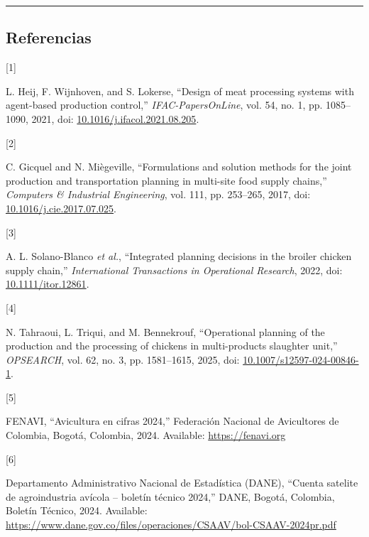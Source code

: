 \documentclass[
  spanish,
  12pt,
]{article}
\newlength{\cslhangindent}
\newlength{\csllabelwidth}
\newenvironment{CSLReferences}[2] %
 {\begin{list}{}{%
  \setlength{\itemindent}{0pt}
  \setlength{\leftmargin}{0pt}
  \setlength{\parsep}{0pt}
  \ifodd #1
   \setlength{\leftmargin}{\cslhangindent}
   \setlength{\itemindent}{-1\cslhangindent}
  \fi
  \setlength{\itemsep}{#2\baselineskip}}}
 {\end{list}}
\newcommand{\CSLLeftMargin}[1]{\parbox[t]{\csllabelwidth}{\strut#1\strut}}
\newcommand{\CSLRightInline}[1]{\parbox[t]{\linewidth - \csllabelwidth}{\strut#1\strut}}
\begin{document}
\begin{center}\rule{0.5\linewidth}{0.5pt}\end{center}

\subsection{Referencias}\label{referencias}

\protect{}\label{refs}
\begin{CSLReferences}{0}{0}
\CSLLeftMargin{{[}1{]} }%
\CSLRightInline{L. Heij, F. Wijnhoven, and S. Lokerse, {``Design of meat
processing systems with agent-based production control,''}
\emph{IFAC-PapersOnLine}, vol. 54, no. 1, pp. 1085--1090, 2021, doi:
\href{https://doi.org/10.1016/j.ifacol.2021.08.205}{10.1016/j.ifacol.2021.08.205}.}

\CSLLeftMargin{{[}2{]} }%
\CSLRightInline{C. Gicquel and N. Miègeville, {``Formulations and
solution methods for the joint production and transportation planning in
multi-site food supply chains,''} \emph{Computers \& Industrial
Engineering}, vol. 111, pp. 253--265, 2017, doi:
\href{https://doi.org/10.1016/j.cie.2017.07.025}{10.1016/j.cie.2017.07.025}.}

\CSLLeftMargin{{[}3{]} }%
\CSLRightInline{A. L. Solano-Blanco \emph{et al.}, {``Integrated
planning decisions in the broiler chicken supply chain,''}
\emph{International Transactions in Operational Research}, 2022, doi:
\href{https://doi.org/10.1111/itor.12861}{10.1111/itor.12861}.}

\CSLLeftMargin{{[}4{]} }%
\CSLRightInline{N. Tahraoui, L. Triqui, and M. Bennekrouf,
{``Operational planning of the production and the processing of chickens
in multi-products slaughter unit,''} \emph{OPSEARCH}, vol. 62, no. 3,
pp. 1581--1615, 2025, doi:
\href{https://doi.org/10.1007/s12597-024-00846-1}{10.1007/s12597-024-00846-1}.}

\CSLLeftMargin{{[}5{]} }%
\CSLRightInline{FENAVI, {``Avicultura en cifras 2024,''} Federación
Nacional de Avicultores de Colombia, Bogotá, Colombia, 2024. Available:
\url{https://fenavi.org}}

\CSLLeftMargin{{[}6{]} }%
\CSLRightInline{Departamento Administrativo Nacional de Estadística
(DANE), {``Cuenta satelite de agroindustria avícola -- boletín técnico
2024,''} DANE, Bogotá, Colombia, Boletín Técnico, 2024. Available:
\url{https://www.dane.gov.co/files/operaciones/CSAAV/bol-CSAAV-2024pr.pdf}}


\end{CSLReferences}
\end{document}
